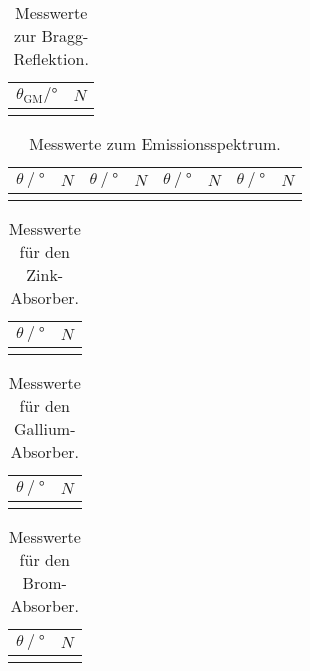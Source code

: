 \begin{table}[H]
  \centering
  \caption{Messwerte zur Bragg-Reflektion.}
  \begin{tabular}{S[table-format=2.1] c}
  \toprule
  {$\theta_\text{GM} / \si{\degree}$} &
  {$N$} \\
  \midrule
  \bottomrule
  \end{tabular}
\end{table}

\begin{table}[H]
  \centering
  \caption{Messwerte zum Emissionsspektrum.}
  \begin{tabular}{S[table-format=2.1] c | S[table-format=2.1] c | S[table-format=2.1] c | S[table-format=2.1] c}
  \toprule
  {$\theta \mathbin{/} \si{\degree}$} &
  {$N$} &
  {$\theta \mathbin{/} \si{\degree}$} &
  {$N$} &
  {$\theta \mathbin{/} \si{\degree}$} &
  {$N$} &
  {$\theta \mathbin{/} \si{\degree}$} &
  {$N$} \\
  \midrule
  \bottomrule
  \end{tabular}
\end{table}


\begin{table}[H]
  \centering
  \caption{Messwerte für den Zink-Absorber.}
  \begin{tabular}{S[table-format=2.1] c}
  \toprule
  {$\theta \mathbin{/} \si{\degree}$} &
  {$N$} \\
  \midrule
  \bottomrule
  \end{tabular}
\end{table}

\begin{table}[H]
  \centering
  \caption{Messwerte für den Gallium-Absorber.}
  \begin{tabular}{S[table-format=2.1] c}
  \toprule
  {$\theta \mathbin{/} \si{\degree}$} &
  {$N$} \\
  \midrule
  \bottomrule
  \end{tabular}
\end{table}

\begin{table}[H]
  \centering
  \caption{Messwerte für den Brom-Absorber.}
  \begin{tabular}{S[table-format=2.1] c}
  \toprule
  {$\theta \mathbin{/} \si{\degree}$} &
  {$N$} \\
  \midrule
  \bottomrule
  \end{tabular}
\end{table}

